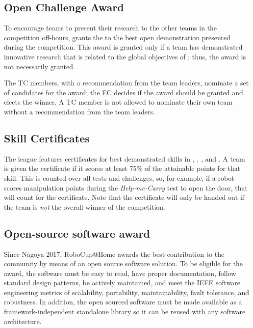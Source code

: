 \subsection{Open Challenge Award}
\label{award:oc}

To encourage teams to present their research to the other teams in the competition off-hours, \AtHome{} grants the \OCAward{} to the best open demonstration presented during the competition.
This award is granted only if a team has demonstrated innovative research that is related to the global objectives of \AtHome; thus, the award is not necessarily granted.

The \AtHome{} TC members, with a recommendation from the team leaders, nominate a set of candidates for the award; the EC decides if the award should be granted and elects the winner.
A TC member is not allowed to nominate their own team without a recommendation from the team leaders.

\subsection{Skill Certificates}
\label{award:skill}

The \AtHome{} league features certificates for best demonstrated skills in \NAV, \MAN, \PerRec, and \NLP.
A team is given the certificate if it scores at least 75\% of the attainable points for that skill.
This is counted over all tests and challenges, so, for example, if a robot scores manipulation points during the \emph{Help-me-Carry} test to open the door, that will count for the \MAN{} certificate.
Note that the certificate will only be handed out if the team is \emph{not} the overall winner of the competition.

\subsection{Open-source software award}
\label{award:oss}

Since Nagoya 2017, RoboCup@Home awards the best contribution to the community by means of an open source software solution.
To be eligible for the award, the software must be easy to read, have proper documentation, follow standard design patterns, be actively maintained, and meet the IEEE software engineering metrics of scalability, portability, maintainability, fault tolerance, and robustness.
In addition, the open sourced software must be made available as a framework-independent standalone library so it can be reused with any software architecture.

